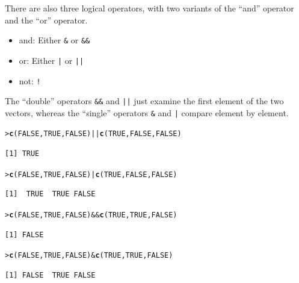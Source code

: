 \documentclass[12pt,oneside]{book}\usepackage[]{graphicx}\usepackage[]{color}
\makeatletter
\newcommand{\hlnum}[1]{\textcolor[rgb]{0.686,0.059,0.569}{#1}}%
\newcommand{\hlopt}[1]{\textcolor[rgb]{0,0,0}{#1}}%
\newcommand{\hlstd}[1]{\textcolor[rgb]{0.345,0.345,0.345}{#1}}%
\newcommand{\hlkwd}[1]{\textcolor[rgb]{0.737,0.353,0.396}{\textbf{#1}}}%
\newenvironment{kframe}{%
 \def\at@end@of@kframe{}%
 \ifinner\ifhmode%
  \def\at@end@of@kframe{\end{minipage}}%
  \begin{minipage}{\columnwidth}%
 \fi\fi%
 \def\FrameCommand##1{\hskip\@totalleftmargin \hskip-\fboxsep
 \colorbox{shadecolor}{##1}\hskip-\fboxsep
     \hskip-\linewidth \hskip-\@totalleftmargin \hskip\columnwidth}%
 \MakeFramed {\advance\hsize-\width
   \@totalleftmargin\z@ \linewidth\hsize
   \@setminipage}}%
 {\par\unskip\endMakeFramed%
 \at@end@of@kframe}
\newenvironment{knitrout}{}{} %
\makeatother
\begin{document}
There are also three logical operators, with two variants of the ``and'' operator and the ``or'' operator.
\begin{itemize}
\item and: Either  \verb+&+ or \verb+&&+
\item or: Either \verb+|+ or \verb+||+
\item not: \verb+!+
\end{itemize}
The ``double'' operators \verb+&&+ and \verb+||+ just examine the first element of the two vectors, whereas the ``single''  operators \verb+&+ and \verb+|+ compare element by element.
\begin{knitrout}
\color{fgcolor}\begin{kframe}
\begin{alltt}
\hlstd{> }\hlkwd{c}\hlstd{(}\hlnum{FALSE}\hlstd{,} \hlnum{TRUE}\hlstd{,} \hlnum{FALSE}\hlstd{)} \hlopt{||} \hlkwd{c}\hlstd{(}\hlnum{TRUE}\hlstd{,} \hlnum{FALSE}\hlstd{,} \hlnum{FALSE}\hlstd{)}
\end{alltt}
\begin{verbatim}
[1] TRUE
\end{verbatim}
\begin{alltt}
\hlstd{> }\hlkwd{c}\hlstd{(}\hlnum{FALSE}\hlstd{,} \hlnum{TRUE}\hlstd{,} \hlnum{FALSE}\hlstd{)} \hlopt{|} \hlkwd{c}\hlstd{(}\hlnum{TRUE}\hlstd{,} \hlnum{FALSE}\hlstd{,} \hlnum{FALSE}\hlstd{)}
\end{alltt}
\begin{verbatim}
[1]  TRUE  TRUE FALSE
\end{verbatim}
\begin{alltt}
\hlstd{> }\hlkwd{c}\hlstd{(}\hlnum{FALSE}\hlstd{,} \hlnum{TRUE}\hlstd{,} \hlnum{FALSE}\hlstd{)} \hlopt{&&} \hlkwd{c}\hlstd{(}\hlnum{TRUE}\hlstd{,} \hlnum{TRUE}\hlstd{,} \hlnum{FALSE}\hlstd{)}
\end{alltt}
\begin{verbatim}
[1] FALSE
\end{verbatim}
\begin{alltt}
\hlstd{> }\hlkwd{c}\hlstd{(}\hlnum{FALSE}\hlstd{,} \hlnum{TRUE}\hlstd{,} \hlnum{FALSE}\hlstd{)} \hlopt{&} \hlkwd{c}\hlstd{(}\hlnum{TRUE}\hlstd{,} \hlnum{TRUE}\hlstd{,} \hlnum{FALSE}\hlstd{)}
\end{alltt}
\begin{verbatim}
[1] FALSE  TRUE FALSE
\end{verbatim}
\end{kframe}
\end{knitrout}
\end{document}
